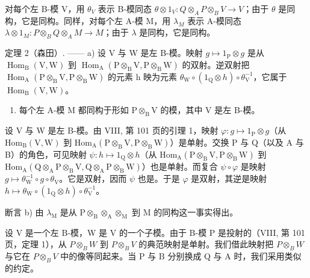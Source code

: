 对每个左 B-模 V，用 \(\theta_{V}\) 表示 B-模同态 \(\theta\otimes1_{V}:Q\otimes_{A}P\otimes_{B}V\to V\)；由于 \(\theta\) 是同构，它是同构。同样，对每个左 A-模 M，用 \(\lambda_{M}\) 表示 A-模同态 \(\lambda\otimes1_{M}:P\otimes_{B}Q\otimes_{A}M\to M\)；由于 \(\lambda\) 是同构，它是同构。

定理 2（森田）. —— a) 设 V 与 W 是左 B-模。映射 \(g \mapsto 1_{\mathrm{P}} \otimes g\) 是从 \(\operatorname{Hom}_{\mathrm{B}}(\mathrm{V}, \mathrm{W})\) 到 \(\operatorname{Hom}_{\mathrm{A}}(\mathrm{P} \otimes_{\mathrm{B}} \mathrm{V}, \mathrm{P} \otimes_{\mathrm{B}} \mathrm{W})\) 的双射。逆双射把 \(\operatorname{Hom}_{\mathrm{A}}(\mathrm{P} \otimes_{\mathrm{B}} \mathrm{V}, \mathrm{P} \otimes_{\mathrm{B}} \mathrm{W})\) 的元素 h 映为元素 \(\theta_{\mathrm{W}} \circ (1_{\mathrm{Q}} \otimes h) \circ \theta_{\mathrm{V}}^{-1}\)，它属于 \(\operatorname{Hom}_{\mathrm{B}}(\mathrm{V}, \mathrm{W})\)。

\begin{enumerate}
\def\labelenumi{\alph{enumi})}
\setcounter{enumi}{1}
\tightlist
\item
  每个左 A-模 M 都同构于形如 \(\mathrm{P} \otimes_{\mathrm{B}} \mathrm{V}\) 的模，其中 V 是左 B-模。
\end{enumerate}

设 V 与 W 是左 B-模。由 VIII, 第 101 页的引理 1，映射 \(\varphi : g \mapsto 1_{\mathrm{P}} \otimes g\)（从 \(\mathrm{Hom}_{\mathrm{B}}(\mathrm{V}, \mathrm{W})\) 到 \(\mathrm{Hom}_{\mathrm{A}}(\mathrm{P} \otimes_{\mathrm{B}} \mathrm{V}, \mathrm{P} \otimes_{\mathrm{B}} \mathrm{W})\)）是单射。交换 P 与 Q（以及 A 与 B）的角色，可见映射 \(\psi : h \mapsto 1_{\mathrm{Q}} \otimes h\)（从 \(\mathrm{Hom}_{\mathrm{A}}(\mathrm{P} \otimes_{\mathrm{B}} \mathrm{V}, \mathrm{P} \otimes_{\mathrm{B}} \mathrm{W})\) 到 \(\mathrm{Hom}_{\mathrm{A}}(\mathrm{Q} \otimes_{\mathrm{A}} \mathrm{P} \otimes_{\mathrm{B}} \mathrm{V}, \mathrm{Q} \otimes_{\mathrm{A}} \mathrm{P} \otimes_{\mathrm{B}} \mathrm{W})\)）也是单射。而复合 \(\psi \circ \varphi\) 是映射 \(g \mapsto \theta_{\mathrm{W}}^{-1} \circ g \circ \theta_{\mathrm{V}}\)。它是双射，因而 \(\psi\) 也是。于是 \(\varphi\) 是双射，其逆是映射 \(h \mapsto \theta_{\mathrm{W}} \circ (1_{\mathrm{Q}} \otimes h) \circ \theta_{\mathrm{V}}^{-1}\)。

断言 b) 由 \(\lambda_{\mathrm{M}}\) 是从 \(\mathrm{P} \otimes_{\mathrm{B}} \otimes_{\mathrm{A}} \otimes_{\mathrm{M}}\) 到 \(\mathrm{M}\) 的同构这一事实得出。

设 V 是一个左 B-模，W 是 V 的一个子模。由于 B-模 P 是投射的（VIII, 第 101 页，定理 1），从 \(P \otimes_{B} W\) 到 \(P \otimes_{B} V\) 的典范映射是单射。我们借此映射把 \(P \otimes_{B} W\) 与它在 \(P \otimes_{B} V\) 中的像等同起来。当 P 与 B 分别换成 Q 与 A 时，我们采用类似的约定。

